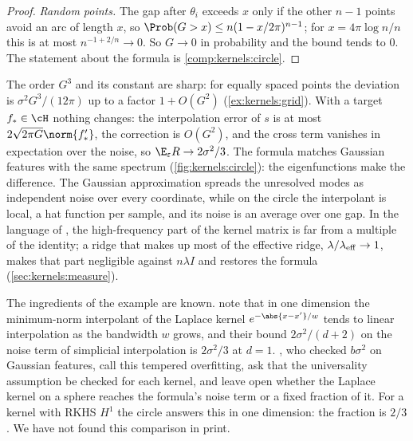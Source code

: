 \begin{refsection}
\begin{proof}
\emph{Random points.} The gap after $\theta_i$ exceeds $x$ only if the other $n-1$ points avoid an arc of length $x$, so $\Prob(G>x)\le n(1-x/2\pi)^{n-1}$; for $x=4\pi\log n/n$ this is at most $n^{-1+2/n}\to0$. So $G\to0$ in probability and the bound tends to $0$. The statement about the formula is \cref{comp:kernels:circle}.
\end{proof}

The order $G^3$ and its constant are sharp: for equally spaced points the deviation is $\sigma^2G^3/(12\pi)$ up to a factor $1+O(G^2)$ (\cref{ex:kernels:grid}). With a target $f_*\in\cH$ nothing changes: the interpolation error of $s$ is at most $2\sqrt{2\pi G}\norm{f_*'}$, the correction is $O(G^2)$, and the cross term vanishes in expectation over the noise, so $\E_\varepsilon R\to2\sigma^2/3$. The formula matches Gaussian features with the same spectrum (\cref{fig:kernels:circle}): the eigenfunctions make the difference. The Gaussian approximation spreads the unresolved modes as independent noise over every coordinate, while on the circle the interpolant is local, a hat function per sample, and its noise is an average over one gap. In the language of \textcite{MisiakiewiczSaeed2024}, the high-frequency part of the kernel matrix is far from a multiple of the identity; a ridge that makes up most of the effective ridge, $\lambda/\lambda_{\mathrm{eff}}\to1$, makes that part negligible against $n\lambda I$ and restores the formula (\cref{sec:kernels:measure}).

The ingredients of the example are known. \Textcite{BelkinEtAl2018} note that in one dimension the minimum-norm interpolant of the Laplace kernel $e^{-\abs{x-x'}/w}$ tends to linear interpolation as the bandwidth $w$ grows, and their bound $2\sigma^2/(d+2)$ on the noise term of simplicial interpolation is $2\sigma^2/3$ at $d=1$. \Textcite{MallinarEtAl2022}, who checked $b\sigma^2$ on Gaussian features, call this tempered overfitting, ask that the universality assumption be checked for each kernel, and leave open whether the Laplace kernel on a sphere reaches the formula's noise term or a fixed fraction of it. For a kernel with RKHS $H^1$ the circle answers this in one dimension: the fraction is $2/3$. We have not found this comparison in print.


\end{refsection}

